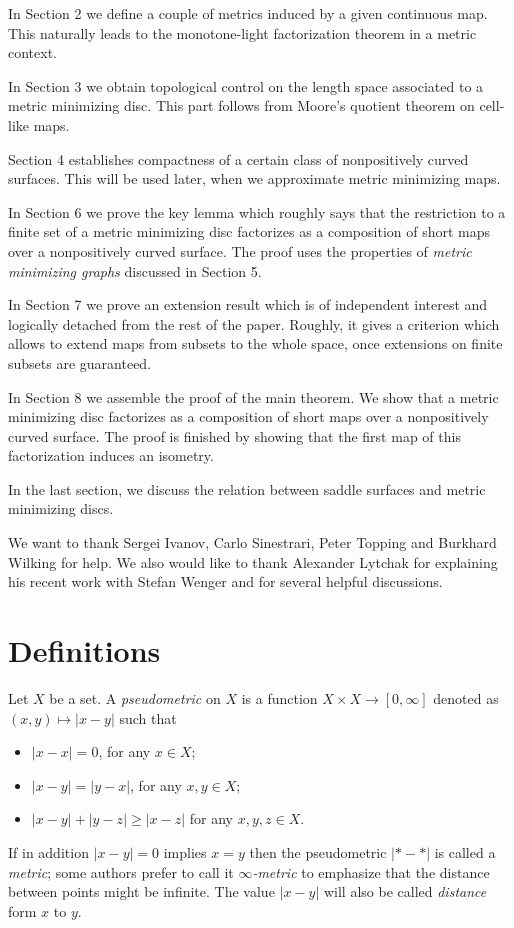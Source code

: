 \documentclass{article}
\begin{document}
In Section 2 we define a couple of metrics induced by a given continuous map.
This naturally leads to the monotone-light factorization theorem in a metric context.
 
In Section 3 we obtain topological control on the length space
associated to a metric minimizing disc. 
This part follows from Moore's quotient theorem on cell-like maps.
 
Section 4 establishes compactness of a certain class of nonpositively curved surfaces.
This will be used later, when we approximate metric minimizing maps.
 
In Section 6 we prove the key lemma which roughly says that the restriction to a finite set of
a metric minimizing disc factorizes as a composition of short maps over a nonpositively curved surface.
The proof uses the properties of \emph{metric minimizing graphs} discussed in Section 5.
 
In Section 7 we prove an extension result which is of independent interest and logically detached
from the rest of the paper.
Roughly, it gives a criterion which allows to extend maps from subsets
to the whole space, once extensions on finite subsets are guaranteed.
 
In Section 8 we assemble the proof of the main theorem.
We show that a metric minimizing disc factorizes as a composition of short maps over a
nonpositively curved surface.
The proof is finished by showing that the first map of this factorization
induces an isometry.

In the last section, we discuss the relation between saddle surfaces and metric minimizing discs.

We want to thank 
Sergei Ivanov, 
Carlo Sinestrari, 
Peter Topping 
and Burkhard Wilking 
for help.
We also would like to thank Alexander Lytchak for explaining his recent work with Stefan Wenger and for several helpful discussions.


\section{Definitions}

Let $X$ be a set.
A \emph{pseudometric} on $X$ 
is a function $X\times X\to[0,\infty]$ denoted as $(x,y)\mapsto |x-y|$
such that 
\begin{itemize}
\item $|x-x|=0$, for any $x\in X$;
\item $|x-y|=|y-x|$, for any $x,y\in X$;
\item $|x-y|+|y-z|\ge|x-z|$ for any  $x,y,z\in X$.
\end{itemize}
If in addition $|x-y|=0$ implies $x=y$ then the pseudometric $|{*}-{*}|$ is called a \emph{metric}; some authors prefer to call it \emph{$\infty$-metric} to emphasize that the distance between points might be infinite.
The value $|x-y|$ will also be called \emph{distance} form $x$ to $y$.
\end{document}
